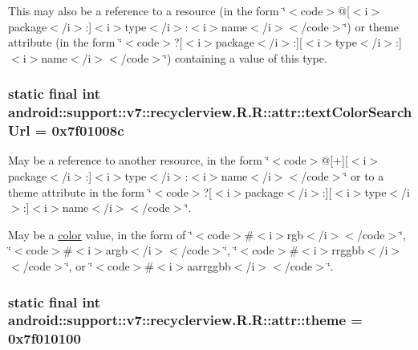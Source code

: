This may also be a reference to a resource (in the form \char`\"{}$<$code$>$@\mbox{[}$<$i$>$package$<$/i$>$:\mbox{]}$<$i$>$type$<$/i$>$:$<$i$>$name$<$/i$>$$<$/code$>$\char`\"{}) or theme attribute (in the form \char`\"{}$<$code$>$?\mbox{[}$<$i$>$package$<$/i$>$:\mbox{]}\mbox{[}$<$i$>$type$<$/i$>$:\mbox{]}$<$i$>$name$<$/i$>$$<$/code$>$\char`\"{}) containing a value of this type. \hypertarget{classandroid_1_1support_1_1v7_1_1recyclerview_1_1_r_1_1attr_18fd32aa108cdbc5fa0873447a2d2b9a}{
\subsubsection[{textColorSearchUrl}]{\setlength{\rightskip}{0pt plus 5cm}static final int android::support::v7::recyclerview.R.R::attr::textColorSearchUrl = 0x7f01008c}}
\label{classandroid_1_1support_1_1v7_1_1recyclerview_1_1_r_1_1attr_18fd32aa108cdbc5fa0873447a2d2b9a}


May be a reference to another resource, in the form \char`\"{}$<$code$>$@\mbox{[}+\mbox{]}\mbox{[}$<$i$>$package$<$/i$>$:\mbox{]}$<$i$>$type$<$/i$>$:$<$i$>$name$<$/i$>$$<$/code$>$\char`\"{} or to a theme attribute in the form \char`\"{}$<$code$>$?\mbox{[}$<$i$>$package$<$/i$>$:\mbox{]}\mbox{[}$<$i$>$type$<$/i$>$:\mbox{]}$<$i$>$name$<$/i$>$$<$/code$>$\char`\"{}. 

May be a \hyperlink{classandroid_1_1support_1_1v7_1_1recyclerview_1_1_r_1_1color}{color} value, in the form of \char`\"{}$<$code$>$\#$<$i$>$rgb$<$/i$>$$<$/code$>$\char`\"{}, \char`\"{}$<$code$>$\#$<$i$>$argb$<$/i$>$$<$/code$>$\char`\"{}, \char`\"{}$<$code$>$\#$<$i$>$rrggbb$<$/i$>$$<$/code$>$\char`\"{}, or \char`\"{}$<$code$>$\#$<$i$>$aarrggbb$<$/i$>$$<$/code$>$\char`\"{}. \hypertarget{classandroid_1_1support_1_1v7_1_1recyclerview_1_1_r_1_1attr_0fd76b12c0060125b2922d2bee65c911}{
\subsubsection[{theme}]{\setlength{\rightskip}{0pt plus 5cm}static final int android::support::v7::recyclerview.R.R::attr::theme = 0x7f010100}}
\label{classandroid_1_1support_1_1v7_1_1recyclerview_1_1_r_1_1attr_0fd76b12c0060125b2922d2bee65c911}


